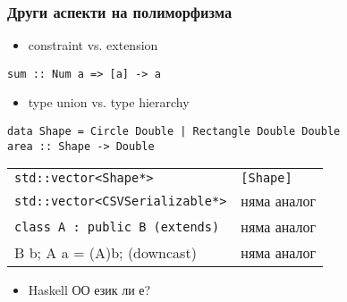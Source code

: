\documentclass{beamer}
\begin{document}
\begin{frame}[fragile]
\frametitle{Други аспекти на полиморфизма}

\begin{itemize}
  \item constraint vs. extension
\end{itemize}
\begin{lstlisting}[basicstyle=\small]
sum :: Num a => [a] -> a  
\end{lstlisting}

\begin{itemize}
  \item type union vs. type hierarchy
\end{itemize}
\begin{lstlisting}[basicstyle=\small]
data Shape = Circle Double | Rectangle Double Double
area :: Shape -> Double
\end{lstlisting}

\begin{center}  
    \begin{tabular}{l | l}
      \verb|std::vector<Shape*>| & \verb|[Shape]| 
      \\ 
      \verb|std::vector<CSVSerializable*>| & няма аналог
      \\
      \verb|class A : public B (extends)| & няма аналог  
      \\
      B b; A a = (A)b; (downcast) & няма аналог
    \end{tabular}

\begin{itemize}
  \item Haskell ОО език ли е?
\end{itemize}

\end{center}



\end{frame}




\end{document}
